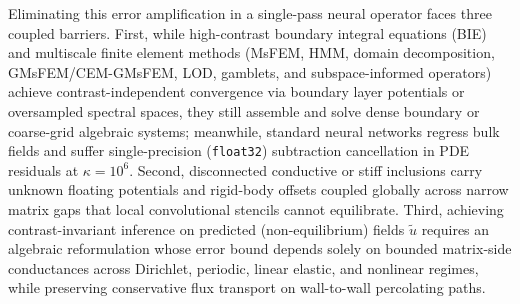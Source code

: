 \documentclass[preprint,11pt]{elsarticle}
\begin{document}
Eliminating this error amplification in a single-pass neural operator faces three coupled barriers. First, while high-contrast boundary integral equations (BIE)~\cite{greengard1994fast,cheng1998efficient,helsing2011integral} and multiscale finite element methods (MsFEM, HMM, domain decomposition, GMsFEM/CEM-GMsFEM, LOD, gamblets, and subspace-informed operators)~\cite{hou1997msfem,e2003hmm,chu2010new,galvis2010domain,efendiev2013gmsfem,malqvist2014localization,owhadi2017multigrid,chung2018cem,rudikov2026gmsfemno} achieve contrast-independent convergence via boundary layer potentials or oversampled spectral spaces, they still assemble and solve dense boundary or coarse-grid algebraic systems; meanwhile, standard neural networks regress bulk fields and suffer single-precision (\texttt{float32}) subtraction cancellation in PDE residuals at $\kappa = 10^6$. Second, disconnected conductive or stiff inclusions carry unknown floating potentials and rigid-body offsets coupled globally across narrow matrix gaps that local convolutional stencils cannot equilibrate. Third, achieving contrast-invariant inference on predicted (non-equilibrium) fields $\tilde u$ requires an algebraic reformulation whose error bound depends solely on bounded matrix-side conductances across Dirichlet, periodic, linear elastic, and nonlinear regimes, while preserving conservative flux transport on wall-to-wall percolating paths.
\end{document}
